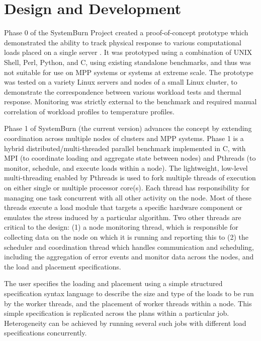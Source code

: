 \section{Design and Development}

Phase 0 of the SystemBurn Project created a proof-of-concept prototype
which demonstrated the ability to track physical response to various
computational loads placed on a single server \cite{SystemBurn2009}. It was
prototyped using a combination of UNIX Shell, Perl, Python, and C, using
existing standalone benchmarks, and thus was not suitable for use on
MPP systems or systems at extreme scale. The prototype was tested on a
variety Linux servers and nodes of a small Linux cluster, to demonstrate
the correspondence between various workload tests and thermal response.
Monitoring was strictly external to the benchmark and required manual
correlation of workload profiles to temperature profiles.

Phase 1 of SystemBurn (the current version) advances the concept
by extending coordination across multiple nodes of clusters and MPP
systems. Phase 1 is a hybrid distributed/multi-threaded parallel benchmark
implemented in C, with MPI (to coordinate loading and aggregate state
between nodes) and Pthreads (to monitor, schedule, and execute loads
within a node). The lightweight, low-level multi-threading enabled
by Pthreads is used to fork multiple threads of execution on either
single or multiple processor core(s). Each thread has responsibility for
managing one task concurrent with all other activity on the node. Most
of these threads execute a load module that targets a specific hardware
component or emulates the stress induced by a particular algorithm. Two
other threads are critical to the design: (1) a node monitoring thread,
which is responsible for collecting data on the node on which it is
running and reporting this to (2) the scheduler and coordination thread
which handles communication and scheduling, including the aggregation of
error events and monitor data across the nodes, and the load and placement
specifications.

The user specifies the loading and placement using a simple structured
specification syntax language to describe the size and type of the loads
to be run by the worker threads, and the placement of worker threads
within a node. This simple specification is replicated across the plans 
within a particular job. Heterogeneity can be achieved by running several such
jobs with different load specifications concurrently.

